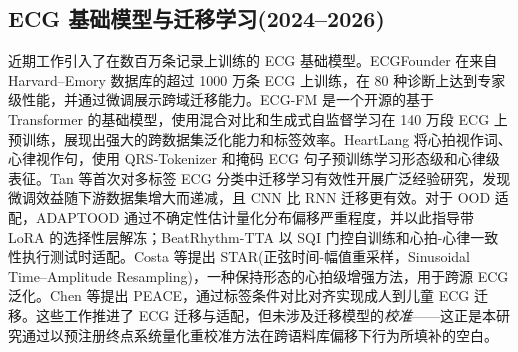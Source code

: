 \subsection{ECG 基础模型与迁移学习(2024--2026)}
近期工作引入了在数百万条记录上训练的 ECG 基础模型。ECGFounder \cite{ecgfounder2024,song2024ecgfm}在来自 Harvard--Emory 数据库的超过 1000 万条 ECG 上训练，在 80 种诊断上达到专家级性能，并通过微调展示跨域迁移能力。ECG-FM \cite{ecgfm2024}是一个开源的基于 Transformer 的基础模型，使用混合对比和生成式自监督学习在 140 万段 ECG 上预训练，展现出强大的跨数据集泛化能力和标签效率。HeartLang \cite{heartlang2025}将心拍视作词、心律视作句，使用 QRS-Tokenizer 和掩码 ECG 句子预训练学习形态级和心律级表征。Tan 等\cite{transferecg2025}首次对多标签 ECG 分类中迁移学习有效性开展广泛经验研究，发现微调效益随下游数据集增大而递减，且 CNN 比 RNN 迁移更有效。对于 OOD 适配，ADAPTOOD \cite{adaptood2026}通过不确定性估计量化分布偏移严重程度，并以此指导带 LoRA 的选择性层解冻；BeatRhythm-TTA \cite{beatrhythm2026}以 SQI 门控自训练和心拍-心律一致性执行测试时适配。Costa 等\cite{star2025}提出 STAR(正弦时间-幅值重采样，Sinusoidal Time--Amplitude Resampling)，一种保持形态的心拍级增强方法，用于跨源 ECG 泛化。Chen 等\cite{peace2026}提出 PEACE，通过标签条件对比对齐实现成人到儿童 ECG 迁移。这些工作推进了 ECG 迁移与适配，但未涉及迁移模型的\emph{校准}——这正是本研究通过以预注册终点系统量化重校准方法在跨语料库偏移下行为所填补的空白。
